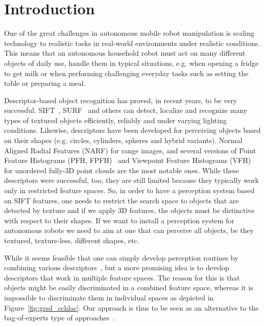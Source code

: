 \documentclass[conference]{sty/IEEEtran}
\begin{document}
\IEEEpeerreviewmaketitle

\section{Introduction}
One of the great challenges in autonomous mobile robot manipulation is scaling
technology to realistic tasks in real-world environments under realistic
conditions. This means that an autonomous household robot must act on many
different objects of daily use, handle them in typical situations, e.g. when
opening a fridge to get milk or when performing challenging everyday tasks
such as setting the table or preparing a meal.

Descriptor-based object recognition has proved, in recent years, to be very successful.
SIFT~\cite{lowe04distinctive}, SURF~\cite{surf} and others can
detect, localize and recognize many types of textured objects efficiently, reliably
and under varying lighting conditions. Likewise, descriptors have been developed 
for perceiving objects based on their shapes (e.g. circles, cylinders, spheres and hybrid variants).
Normal Aligned Radial Features (NARF)\cite{steder10irosws} for range images, 
and several versions of Point Feature  Histograms (PFH, FPFH)~\cite{Rusu09ICRA} and 
Viewpoint Feature Histograms (VFH)~\cite{vfh} for unordered fully-3D point clouds 
are the most notable ones. While these descriptors were successful, too, they are still limited because they
typically work only in restricted feature spaces. So, in order to have a perception system
based on SIFT features, one needs to restrict the search space to objects that are detected by
texture and if we apply 3D features, the objects must be distinctive with respect to their shapes. 
If we want to install a perception system for autonomous robots we need to aim 
at one that can perceive all objects, be they textured, texture-less, different shapes, etc.

While it seems feasible that one can simply develop perception routines by combining
various descriptors~\cite{stueckler10combining, GRSD10Humanoids}, but a more promising idea 
is to develop descriptors that work in multiple feature spaces. The reason for this is 
that objects might be easily discriminated in a combined feature space, whereas it is impossible 
to discriminate them in individual spaces as depicted in Figure~\ref{fig:grsd_cchlac}.
Our approach is thus to be seen as an alternative to the bag-of-experts type
of approaches~\cite{Varma07learningthe}.
\end{document}
